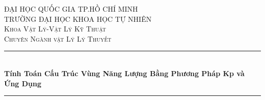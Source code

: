 \documentclass[13pt, a4paper, oneside]{Thesis} %
\title{\ttitle} %
\begin{document}
\frontmatter %
\begin{titlepage}

\newcommand{\HRule}{\rule{\linewidth}{0.5mm}} %

\center %
\textsc{\LARGE ĐẠI HỌC QUỐC GIA TP.HỒ CHÍ MINH }\\ %
\textsc{\LARGE TRƯỜNG ĐẠI HỌC KHOA HỌC TỰ NHIÊN }\\[1.5cm] %
\textsc{\Large Khoa Vật Lý-Vật Lý Kỹ Thuật}\\[0.5cm] %
\textsc{\large Chuyên Ngành vật Lý Lý Thuyết}\\[0.5cm] %


\HRule \\[0.4cm]
{ \huge \bfseries Tính Toán Cấu Trúc Vùng Năng Lượng Bằng Phương Pháp Kp và Ứng Dụng}\\[0.4cm] %

\HRule \\[1.5cm]
 


\end{titlepage}
\end{document}
